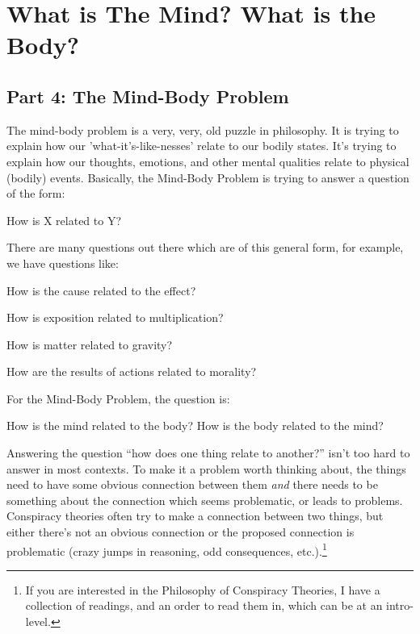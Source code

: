 \part{What is The Mind? What is the Body?}
\label{ch.modthree}

\chapter{Part 4: The Mind-Body Problem}
The mind-body problem is a very, very, old puzzle in philosophy. It is trying to explain how our 'what-it's-like-nesses' relate to our bodily states. It's trying to explain how our thoughts, emotions, and other mental qualities relate to physical (bodily) events. Basically, the Mind-Body Problem is trying to answer a question of the form:

\begin{center}How is X related to Y?\end{center}

There are many questions out there which are of this general form, for example, we have questions like:
\begin{earg}
    \item[]How is the cause related to the effect?
    \item[]How is exposition related to multiplication?
    \item[]How is matter related to gravity?
    \item[]How are the results of actions related to morality?
\end{earg}
For the Mind-Body Problem, the question is:

\begin{center}How is the mind related to the body?
How is the body related to the mind?\end{center}

Answering the question “how does one thing relate to another?” isn’t too hard to answer in most contexts. To make it a problem worth thinking about, the things need to have some obvious connection between them \emph{and} there needs to be something about the connection which seems problematic, or leads to problems. Conspiracy theories often try to make a connection between two things, but either there’s not an obvious connection or the proposed connection is problematic (crazy jumps in reasoning, odd consequences, etc.).\footnote{If you are interested in the Philosophy of Conspiracy Theories, I have a collection of readings, and an order to read them in, which can be at an intro-level.}

